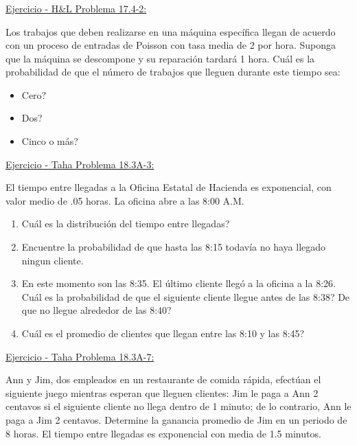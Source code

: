 \documentclass[ 10pt, xcolor = dvipsnames]{beamer}
\begin{document}
\begin{frame}[allowframebreaks]
\frametitle{\insertsection}

\underline{Ejercicio - H\&L Problema 17.4-2:}

Los trabajos que deben realizarse en una m\'aquina espec\'ifica llegan de acuerdo con un proceso de entradas de Poisson con tasa media de 2 por hora. Suponga que la m\'aquina se descompone y su reparaci\'on tardar\'a 1 hora. Cu\'al es la probabilidad de que el n\'umero de trabajos que lleguen durante este tiempo sea: 
\begin{itemize}
\item Cero?
\item Dos?
\item Cinco o m\'as?
\end{itemize}

\framebreak

\underline{Ejercicio - Taha Problema 18.3A-3:}

El tiempo entre llegadas a la Oficina Estatal de Hacienda es exponencial, \linebreak con valor medio de .05 horas. La oficina abre a las 8:00 A.M. 
\begin{enumerate}
\item Cu\'al es la distribuci\'on del tiempo entre llegadas?
\item Encuentre la probabilidad de que hasta las 8:15 todav\'ia no haya llegado ningun cliente. 
\item En este momento son las 8:35. El \'ultimo cliente lleg\'o a la oficina a la 8:26. Cu\'al es la probabilidad de que el siguiente cliente llegue antes de las 8:38? De que no llegue alrededor de las 8:40?
\item Cu\'al es el promedio de clientes que llegan entre las 8:10 y las 8:45?
\end{enumerate}

\framebreak

\underline{Ejercicio - Taha Problema 18.3A-7:}

Ann y Jim, dos empleados en un restaurante de comida r\'apida, efect\'uan el siguiente juego mientras esperan que lleguen clientes: Jim le paga a Ann 2 centavos si el siguiente cliente no llega dentro de 1 minuto; de lo contrario, \linebreak Ann le paga a Jim 2 centavos. Determine la ganancia promedio de Jim en un periodo de 8 horas. El tiempo entre llegadas es exponencial con media de 1.5 minutos. 


\end{frame}
\end{document}
